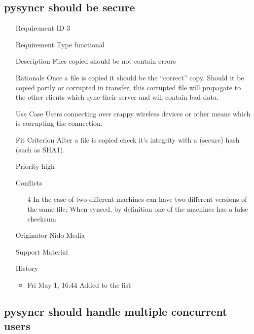 \documentclass{article}
\begin{document}
\subsection{pysyncr should be secure}
\begin{itemize}
  \item[Requirement ID] 3
  \item[Requirement Type] functional 
  \item[Description] Files copied should be not contain errors
  \item[Rationale] Once a file is copied it should be the ``correct''
  copy. Should it be copied partly or corrupted in transfer, this
  corrupted file will propagate to the other clients which sync their
  server and will contain bad data.
  \item[Use Case] Users connecting over crappy wireless devices or
  other means which is corrupting the connection.
  \item[Fit Criterion] After a file is copied check it's integrity with
  a (secure) hash (such as SHA1).
  \item[Priority] high
  \item[Conflicts]
  \begin{itemize}
    \item[4] In the case of two  different machines can have
    two different versions of the same file; When synced, by definition
    one of the machines has a false checksum
  \end{itemize}
  \item[Originator] Nido Media
  \item[Support Material]
  \item[History] 
  \begin{itemize}
    \item Fri May 1, 16:44 Added to the list
  \end{itemize}
\end{itemize}

\subsection{pysyncr should handle multiple concurrent users}
\end{document}
